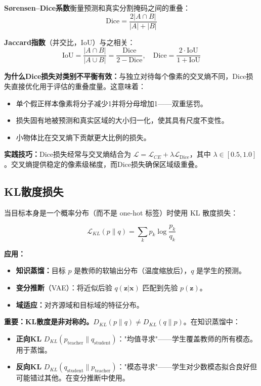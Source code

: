 \textbf{S{\o}rensen--Dice系数}衡量预测和真实分割掩码之间的重叠：
\begin{equation}
\text{Dice} = \frac{2|A \cap B|}{|A| + |B|}
\end{equation}

\textbf{Jaccard指数}（并交比，IoU）与之相关：
\begin{equation}
\text{IoU} = \frac{|A \cap B|}{|A \cup B|} = \frac{\text{Dice}}{2 - \text{Dice}}, \quad \text{Dice} = \frac{2 \cdot \text{IoU}}{1 + \text{IoU}}
\end{equation}

\textbf{为什么Dice损失对类别不平衡有效：}与独立对待每个像素的交叉熵不同，Dice损失直接优化用于评估的重叠度量。这意味着：
\begin{itemize}
    \item 单个假正样本像素将分子减少1并将分母增加1——双重惩罚。
    \item 损失固有地被预测和真实区域的大小归一化，使其具有尺度不变性。
    \item 小物体比在交叉熵下贡献更大比例的损失。
\end{itemize}

\textbf{实践技巧：}Dice损失经常与交叉熵结合为 $\mathcal{L} = \mathcal{L}_{CE} + \lambda \mathcal{L}_{\text{Dice}}$，其中 $\lambda \in [0.5, 1.0]$。交叉熵提供稳定的像素级梯度，而Dice损失确保区域级重叠。

\subsection{KL散度损失}

当目标本身是一个概率分布（而不是 one-hot 标签）时使用 KL 散度损失：

\begin{equation}
\mathcal{L}_{KL}(p \| q) = \sum_{k} p_k \log \frac{p_k}{q_k}
\end{equation}

\textbf{应用：}
\begin{itemize}
    \item \textbf{知识蒸馏：}目标 $p$ 是教师的软输出分布（温度缩放后），$q$ 是学生的预测。
    \item \textbf{变分推断}（VAE）：将近似后验 $q(\mathbf{z}|\mathbf{x})$ 匹配到先验 $p(\mathbf{z})$。
    \item \textbf{域适应：}对齐源域和目标域的特征分布。
\end{itemize}

\textbf{重要：KL散度是非对称的。}$D_{KL}(p \| q) \neq D_{KL}(q \| p)$。在知识蒸馏中：
\begin{itemize}
    \item \textbf{正向KL} $D_{KL}(p_{\text{teacher}} \| q_{\text{student}})$："均值寻求"——学生覆盖教师的所有模态。用于蒸馏。
    \item \textbf{反向KL} $D_{KL}(q_{\text{student}} \| p_{\text{teacher}})$："模态寻求"——学生对少数模态拟合良好但可能错过其他。在变分推断中使用。
\end{itemize}

